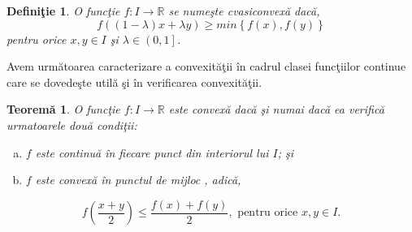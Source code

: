\documentclass[a4paper,12pt,oneside]{report}
\newtheorem{definition}{Defini\c tie}
\newtheorem{theorem}{Teorem\u a}
\begin{document}
\begin{definition}
O func\c{t}ie \(f: I \rightarrow \mathbb{R}\) se nume\c{s}te cvasiconvex\u{a} dac\u{a},
 \begin{displaymath}
  f\left ( \left ( 1-\lambda  \right )x + \lambda y \right )\geq  min\left \{ f\left ( x \right ), f\left ( y \right ) \right \}
\end{displaymath}
pentru orice  \(x, y \in I\) \c{s}i \(\lambda  \in \left ( 0,1 \right ]\).
\end{definition}
	 Avem urm\u{a}toarea caracterizare a convexit\u{a}\c{t}ii \^{i}n cadrul clasei func\c{t}iilor continue care se dovede\c{s}te util\u{a} \c{s}i \^{i}n verificarea convexit\u{a}\c{t}ii.
\begin{theorem}
O func\c{t}ie \(f : I \rightarrow \mathbb{R}\) este convex\u{a} dac\u{a} \c{s}i numai dac\u{a} ea verific\u{a} urmatoarele dou\u{a} condi\c{t}ii:
\begin{enumerate}[a)]
\item \(f\) este continu\u{a} \^{i}n fiecare punct din interiorul lui \(I\); \c{s}i
\item \(f\) este convex\u{a} \^{i}n punctul de mijloc , adic\u{a},
\end{enumerate}
\begin{displaymath}
  f\left ( \frac{x+y}{2} \right )\leq \frac{f\left ( x \right )+f\left ( y \right )}{2}, \text{ pentru orice } x, y \in I.
\end{displaymath}
\end{theorem}
\end{document}

